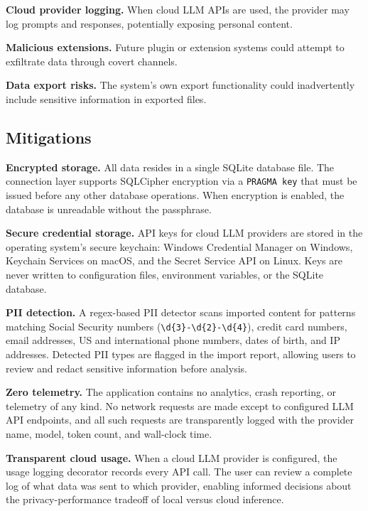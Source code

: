 \documentclass[manuscript,review]{acmart}
\begin{document}
\textbf{Cloud provider logging.}
When cloud LLM APIs are used, the provider may log prompts and responses, potentially exposing personal content.

\textbf{Malicious extensions.}
Future plugin or extension systems could attempt to exfiltrate data through covert channels.

\textbf{Data export risks.}
The system's own export functionality could inadvertently include sensitive information in exported files.

\subsection{Mitigations}
\label{sec:mitigations}

\textbf{Encrypted storage.}
All data resides in a single SQLite database file.
The connection layer supports SQLCipher encryption via a \texttt{PRAGMA key} that must be issued before any other database operations.
When encryption is enabled, the database is unreadable without the passphrase.

\textbf{Secure credential storage.}
API keys for cloud LLM providers are stored in the operating system's secure keychain: Windows Credential Manager on Windows, Keychain Services on macOS, and the Secret Service API on Linux.
Keys are never written to configuration files, environment variables, or the SQLite database.

\textbf{PII detection.}
A regex-based PII detector scans imported content for patterns matching Social Security numbers (\texttt{\textbackslash d\{3\}-\textbackslash d\{2\}-\textbackslash d\{4\}}), credit card numbers, email addresses, US and international phone numbers, dates of birth, and IP addresses.
Detected PII types are flagged in the import report, allowing users to review and redact sensitive information before analysis.

\textbf{Zero telemetry.}
The application contains no analytics, crash reporting, or telemetry of any kind.
No network requests are made except to configured LLM API endpoints, and all such requests are transparently logged with the provider name, model, token count, and wall-clock time.

\textbf{Transparent cloud usage.}
When a cloud LLM provider is configured, the usage logging decorator records every API call.
The user can review a complete log of what data was sent to which provider, enabling informed decisions about the privacy-performance tradeoff of local versus cloud inference.
\end{document}
